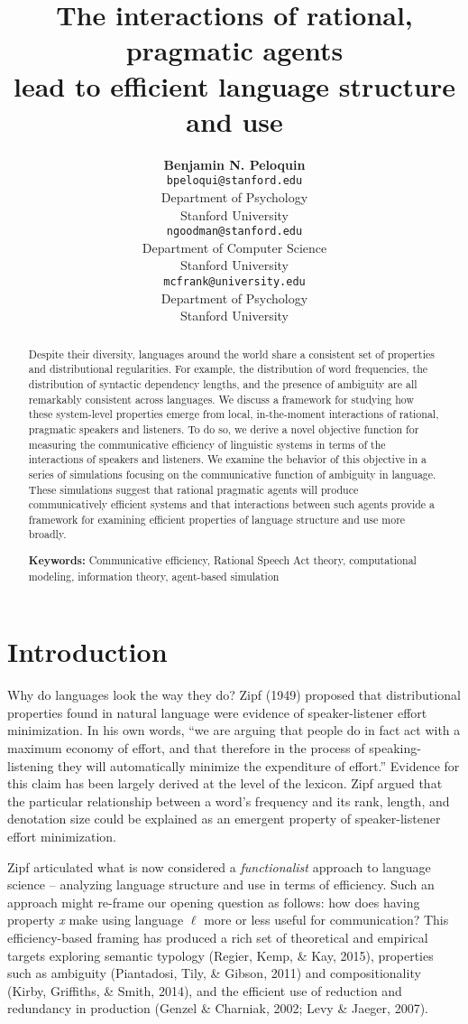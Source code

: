 \documentclass[10pt, letterpaper]{article}
\title{The interactions of rational, pragmatic agents\\
lead to efficient language structure and use}
\author{{\large \bf Benjamin N. Peloquin} \\ \texttt{bpeloqui@stanford.edu} \\ Department of Psychology \\ Stanford University \And {\large \bf Noah D. Goodman} \\ \texttt{ngoodman@stanford.edu} \\ Department of Computer Science \\ Stanford University \And {\large \bf Michael C. Frank} \\ \texttt{mcfrank@university.edu} \\ Department of Psychology \\ Stanford University}
\begin{document}
\maketitle

\begin{abstract}
Despite their diversity, languages around the world share a consistent
set of properties and distributional regularities. For example, the
distribution of word frequencies, the distribution of syntactic
dependency lengths, and the presence of ambiguity are all remarkably
consistent across languages. We discuss a framework for studying how
these system-level properties emerge from local, in-the-moment
interactions of rational, pragmatic speakers and listeners. To do so, we
derive a novel objective function for measuring the communicative
efficiency of linguistic systems in terms of the interactions of
speakers and listeners. We examine the behavior of this objective in a
series of simulations focusing on the communicative function of
ambiguity in language. These simulations suggest that rational pragmatic
agents will produce communicatively efficient systems and that
interactions between such agents provide a framework for examining
efficient properties of language structure and use more broadly.

\textbf{Keywords:}
Communicative efficiency, Rational Speech Act theory, computational
modeling, information theory, agent-based simulation
\end{abstract}

\section{Introduction}\label{introduction}

Why do languages look the way they do? Zipf (1949) proposed that
distributional properties found in natural language were evidence of
speaker-listener effort minimization. In his own words, ``we are arguing
that people do in fact act with a maximum economy of effort, and that
therefore in the process of speaking-listening they will automatically
minimize the expenditure of effort.'' Evidence for this claim has been
largely derived at the level of the lexicon. Zipf argued that the
particular relationship between a word's frequency and its rank, length,
and denotation size could be explained as an emergent property of
speaker-listener effort minimization. \par

Zipf articulated what is now considered a \emph{functionalist} approach
to language science -- analyzing language structure and use in terms of
efficiency. Such an approach might re-frame our opening question as
follows: how does having property \textit{x} make using language
\(\ell\) more or less useful for communication? This efficiency-based
framing has produced a rich set of theoretical and empirical targets
exploring semantic typology (Regier, Kemp, \& Kay, 2015), properties
such as ambiguity (Piantadosi, Tily, \& Gibson, 2011) and
compositionality (Kirby, Griffiths, \& Smith, 2014), and the efficient
use of reduction and redundancy in production (Genzel \& Charniak, 2002;
Levy \& Jaeger, 2007).\par
\end{document}

